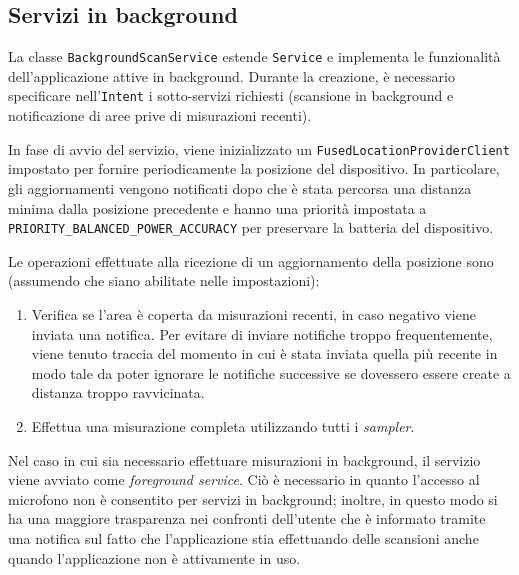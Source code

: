 \subsection{Servizi in background}
La classe \texttt{BackgroundScanService} estende \texttt{Service} e implementa le funzionalità dell'applicazione attive in background.
Durante la creazione, è necessario specificare nell'\texttt{Intent} i sotto-servizi richiesti (scansione in background e notificazione di aree prive di misurazioni recenti).

In fase di avvio del servizio, viene inizializzato un \texttt{FusedLocationProviderClient} impostato per fornire periodicamente la posizione del dispositivo. In particolare, gli aggiornamenti vengono notificati dopo che è stata percorsa una distanza minima dalla posizione precedente e hanno una priorità impostata a \texttt{PRIORITY\_BALANCED\_POWER\_ACCURACY} per preservare la batteria del dispositivo.

Le operazioni effettuate alla ricezione di un aggiornamento della posizione sono (assumendo che siano abilitate nelle impostazioni):
\begin{enumerate}
  \item Verifica se l'area è coperta da misurazioni recenti, in caso negativo viene inviata una notifica.
        Per evitare di inviare notifiche troppo frequentemente, viene tenuto traccia del momento in cui è stata inviata quella più recente in modo tale da poter ignorare le notifiche successive se dovessero essere create a distanza troppo ravvicinata.
  \item Effettua una misurazione completa utilizzando tutti i \textit{sampler}.
\end{enumerate}

Nel caso in cui sia necessario effettuare misurazioni in background, il servizio viene avviato come  \textit{foreground service}. Ciò è necessario in quanto l'accesso al microfono non è consentito per servizi in background; inoltre, in questo modo si ha una maggiore trasparenza nei confronti dell'utente che è informato tramite una notifica sul fatto che l'applicazione stia effettuando delle scansioni anche quando l'applicazione non è attivamente in uso.
